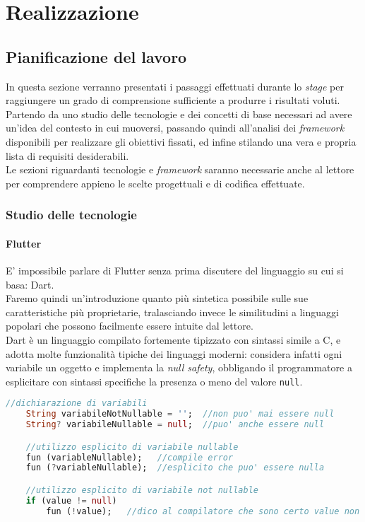 
\chapter{Realizzazione}
\label{cap:realizzazione}

\section{Pianificazione del lavoro}
In questa sezione verranno presentati i passaggi effettuati durante lo \textit{stage} per raggiungere un grado di comprensione sufficiente a produrre i risultati voluti. Partendo da uno studio delle tecnologie e dei concetti di base necessari ad avere un'idea del contesto in cui muoversi, passando quindi all'analisi dei \textit{framework} disponibili per realizzare gli obiettivi fissati, ed infine stilando una vera e propria lista di requisiti desiderabili.\\
Le sezioni riguardanti tecnologie e \textit{framework} saranno necessarie anche al lettore per comprendere appieno le scelte progettuali e di codifica effettuate.

\subsection{Studio delle tecnologie}
\subsubsection{Flutter}
E' impossibile parlare di Flutter senza prima discutere del linguaggio su cui si basa: Dart.\\
Faremo quindi un'introduzione quanto più sintetica possibile sulle sue caratteristiche più proprietarie, tralasciando invece le similitudini a linguaggi popolari che possono facilmente essere intuite dal lettore.\\
Dart è un linguaggio compilato fortemente tipizzato con sintassi simile a C, e adotta molte funzionalità tipiche dei linguaggi moderni: considera infatti ogni variabile un oggetto e implementa la \textit{null safety}, obbligando il programmatore a esplicitare con sintassi specifiche la presenza o meno del valore \verb+null+.

\begin{lstlisting}[language=dart, firstnumber=1,caption={Dart \textit{null safety}}]
    //dichiarazione di variabili
    String variabileNotNullable = '';  //non puo' mai essere null
    String? variabileNullable = null;  //puo' anche essere null

    //utilizzo esplicito di variabile nullable
    fun (variableNullable);   //compile error
    fun (?variableNullable);  //esplicito che puo' essere nulla

    //utilizzo esplicito di variabile not nullable
    if (value != null)
        fun (!value);   //dico al compilatore che sono certo value non sia null
\end{lstlisting} 


